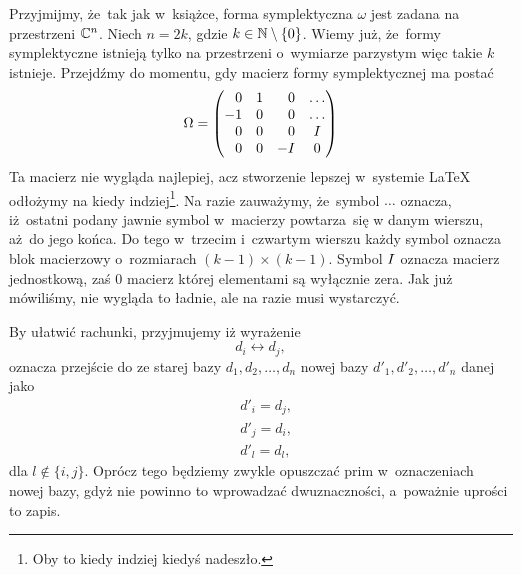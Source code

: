 \documentclass[a4paper,11pt]{article}
\begin{document}
Przyjmijmy, że~tak jak w~książce, forma symplektyczna $\omega$ jest zadana na
przestrzeni $\mathbb{C}^{ n }$. Niech $n = 2k$, gdzie $k \in \mathbb{N} \setminus \{ 0 \}$. Wiemy
już, że~formy symplektyczne istnieją tylko na przestrzeni o~wymiarze
parzystym więc takie $k$ istnieje. Przejdźmy do momentu, gdy macierz formy symplektycznej ma postać
\begin{equation}
  \label{eq:Wojtynski-13}
  \Omega =
  \begin{pmatrix}
    \hphantom{-} 0 & 1 & \hphantom{-} 0 & \ldots \\
    -1 & 0 & \hphantom{-} 0 & \ldots \\
    \hphantom{-} 0 & 0 & \hphantom{-} 0 & I \\
    \hphantom{-} 0 & 0 & -I & 0 \\
  \end{pmatrix}
\end{equation}
Ta macierz nie wygląda najlepiej, acz stworzenie lepszej w~systemie \LaTeX{}
odłożymy na kiedy indziej\footnote{Oby to kiedy indziej kiedyś nadeszło.}.
Na razie zauważymy, że~symbol $\ldots$ oznacza, iż~ostatni podany jawnie symbol
w~macierzy powtarza~się w danym wierszu, aż~do jego końca. Do tego w~trzecim
i~czwartym wierszu każdy symbol oznacza blok macierzowy o~rozmiarach
$( k - 1 ) \times ( k - 1 )$. Symbol $I$ oznacza macierz jednostkową, zaś
$0$ macierz której elementami są wyłącznie zera. Jak już mówiliśmy, nie
wygląda to ładnie, ale na razie musi wystarczyć.

By ułatwić rachunki, przyjmujemy iż wyrażenie
\begin{equation}
  \label{eq:Wojtynski-14}
  d_{ i } \leftrightarrow d_{ j },
\end{equation}
oznacza przejście do ze starej bazy $d_{ 1 }, d_{ 2 }, \ldots, d_{ n }$ nowej bazy
$d'_{ 1 }, d'_{ 2 }, \ldots, d'_{ n }$ danej jako
\begin{subequations}
  \begin{align}
    \label{eq:Wojtynski-15-A}
    &d'_{ i } = d_{ j }, \\
    \label{eq:Wojtynski-15-B}
    &d'_{ j } = d_{ i }, \\
    \label{eq:Wojtynski-15-C}
    &d'_{ l } = d_{ l },
  \end{align}
\end{subequations}
dla $l \notin \{ i, j \}$. Oprócz tego będziemy zwykle opuszczać prim
w~oznaczeniach nowej bazy, gdyż nie powinno to wprowadzać dwuznaczności,
a~poważnie uprości to zapis.
\end{document}
